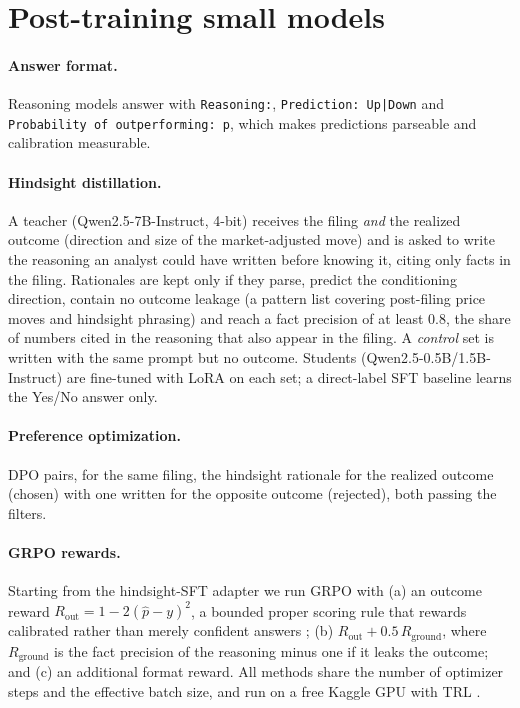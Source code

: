 \documentclass{article}
\begin{document}
\section{Post-training small models}
\label{sec:posttrain}

\paragraph{Answer format.}
Reasoning models answer with \texttt{Reasoning:}, \texttt{Prediction: Up|Down} and
\texttt{Probability of outperforming: p}, which makes predictions parseable and calibration measurable.

\paragraph{Hindsight distillation.}
A teacher (Qwen2.5-7B-Instruct, 4-bit) receives the filing \emph{and} the realized outcome (direction and size of the
market-adjusted move) and is asked to write the reasoning an analyst could have written before knowing it, citing only
facts in the filing. Rationales are kept only if they parse, predict the conditioning direction, contain no outcome
leakage (a pattern list covering post-filing price moves and hindsight phrasing) and reach a fact precision of at
least 0.8, the share of numbers cited in the reasoning that also appear in the filing. A \emph{control} set is written
with the same prompt but no outcome. Students (Qwen2.5-0.5B/1.5B-Instruct) are fine-tuned with LoRA
\citep{hu2022lora} on each set; a direct-label SFT baseline learns the Yes/No answer only.

\paragraph{Preference optimization.}
DPO pairs, for the same filing, the hindsight rationale for the realized outcome (chosen) with one written for the
opposite outcome (rejected), both passing the filters.

\paragraph{GRPO rewards.}
Starting from the hindsight-SFT adapter we run GRPO \citep{shao2024deepseekmath} with (a) an outcome reward
$R_{\mathrm{out}} = 1-2(\hat p-y)^2$, a bounded proper scoring rule \citep{brier1950verification} that rewards
calibrated rather than merely confident answers \citep{damani2026beyond}; (b) $R_{\mathrm{out}}+0.5\,R_{\mathrm{ground}}$,
where $R_{\mathrm{ground}}$ is the fact precision of the reasoning minus one if it leaks the outcome; and (c) an
additional format reward. All methods share the number of optimizer steps and the effective batch size, and run on a
free Kaggle GPU with TRL \citep{vonwerra2020trl}.
\end{document}
